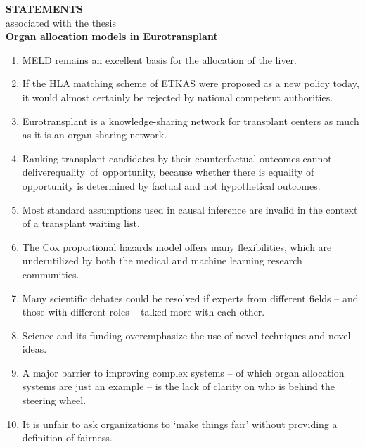 \documentclass[12pt]{article}
\begin{document}
	
	\begin{center}
		{\Large \textbf{STATEMENTS}}\\[1em]
		\setmainfont{PT Serif}
		{\large associated with the thesis}\\[1em]
		{\large \textbf{Organ allocation models in Eurotransplant}}\\[0.5em]
	\end{center}
	
	\vspace{1em}
		
	\begin{enumerate}[leftmargin=1cm, label=\textbf{\arabic*.}]
		\item MELD remains an excellent basis for the allocation of the liver.
		\item If the HLA matching scheme of ETKAS were proposed as a new policy today, it would almost certainly be rejected by national competent authorities.
		\item Eurotransplant is a knowledge-sharing network for transplant centers as much as it is an organ-sharing network.
		\item Ranking transplant candidates by their counterfactual outcomes cannot deliver\linebreak \mbox{equality of opportunity}, because whether there is equality of opportunity is \linebreak determined by factual and not hypothetical outcomes.
		\item Most standard assumptions used in causal inference are invalid in the context of a transplant waiting list. 
		\item The Cox proportional hazards model offers many flexibilities, which are \linebreak underutilized by both the medical and machine learning research communities.  
		\item Many scientific debates could be resolved if experts from different fields -- and those with different roles -- talked more with each other. 
		\item Science and its funding overemphasize the use of novel techniques and novel ideas. 
		\item A major barrier to improving complex systems -- of which organ allocation systems are just an example -- is the lack of clarity on who is behind the steering wheel.  
		\item It is unfair to ask organizations to `make things fair' without providing a definition of fairness.  


	\end{enumerate}
	
\end{document}
